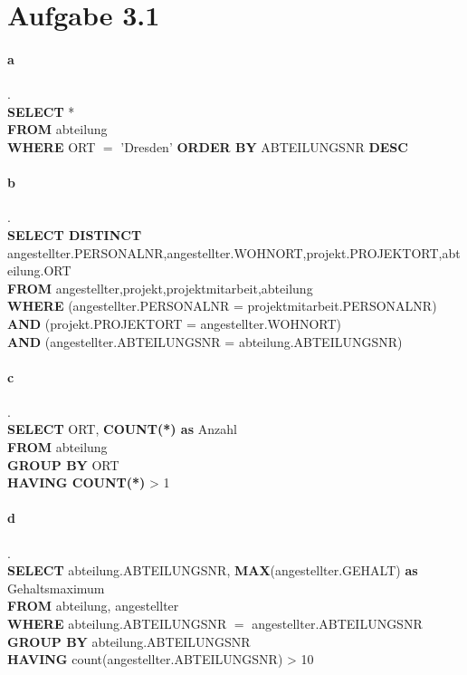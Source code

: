 \documentclass{article}
\begin{document}
	
	
	
	
	\section*{Aufgabe 3.1}
		\paragraph*{a}.\\
			\textbf{SELECT} *\\
			\textbf{FROM} abteilung\\
			\textbf{WHERE} ORT $=$ 'Dresden'
			\textbf{ORDER BY} ABTEILUNGSNR \textbf{DESC}
			
		\paragraph*{b}.\\
			\textbf{SELECT DISTINCT} angestellter.PERSONALNR,angestellter.WOHNORT,projekt.PROJEKTORT,abteilung.ORT\\
			\textbf{FROM} angestellter,projekt,projektmitarbeit,abteilung\\
			\textbf{WHERE} (angestellter.PERSONALNR = projektmitarbeit.PERSONALNR) \textbf{AND} (projekt.PROJEKTORT = angestellter.WOHNORT)\\ \textbf{AND} (angestellter.ABTEILUNGSNR = abteilung.ABTEILUNGSNR)
			
		\paragraph*{c}.\\
			\textbf{SELECT} ORT, \textbf{COUNT(*) as} Anzahl\\
			\textbf{FROM} abteilung\\
			\textbf{GROUP BY} ORT\\
			\textbf{HAVING COUNT(*)} > 1
			
		\paragraph*{d}.\\
			\textbf{SELECT} abteilung.ABTEILUNGSNR, \textbf{MAX}(angestellter.GEHALT) \textbf{as} Gehaltsmaximum\\
			\textbf{FROM} abteilung, angestellter\\
			\textbf{WHERE} abteilung.ABTEILUNGSNR $ = $ angestellter.ABTEILUNGSNR\\
			\textbf{GROUP BY} abteilung.ABTEILUNGSNR\\
			\textbf{HAVING} count(angestellter.ABTEILUNGSNR) > 10
			
\end{document}
